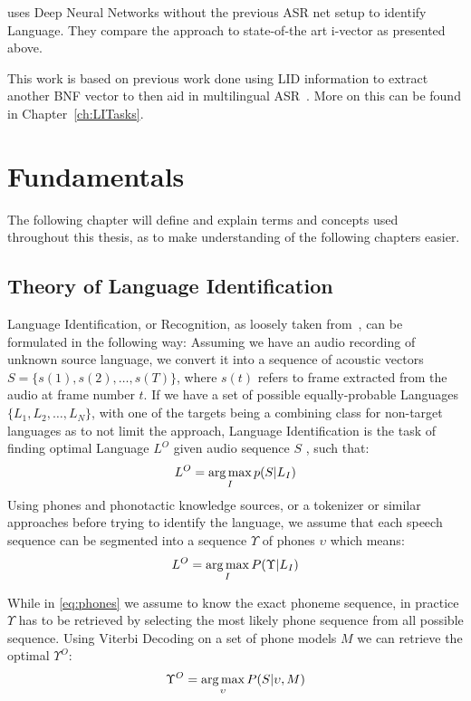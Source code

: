 \cite{6854622} uses Deep Neural Networks without the previous ASR net setup to identify Language. They compare the approach to state-of-the art i-vector as presented above.



This work is based on previous work done using LID information to extract another BNF vector to then aid in multilingual ASR~\cite{Mueller2016b}. More on this can be found in Chapter~\ref{ch:LITasks}.

\chapter{Fundamentals}
\label{ch:fund}

The following chapter will define and explain terms and concepts used throughout this thesis, as to make understanding of the following chapters easier.

\section{Theory of Language Identification}

Language Identification, or Recognition, as loosely taken from~\cite{6451097}, can be formulated in the following way: Assuming we have an audio recording of unknown source language, we convert it into a sequence of acoustic vectors \(S = \{ s(1), s(2), \dots , s(T)\}\), where \(s(t)\) refers to frame extracted from the audio at frame number \(t\). If we have a set of possible equally-probable Languages \(\{L_1,L_2,\dots,L_N\}\), with one of the targets being a combining class for non-target languages as to not limit the approach, Language Identification is the task of finding optimal Language \(L^O\) given audio sequence \(S\) , such that:
\begin{equation}
L^O = \operatorname*{arg\,max}_I p(S|L_I)
\end{equation}
Using phones and phonotactic knowledge sources, or a tokenizer or similar approaches before trying to identify the language, we assume that each speech sequence can be segmented into a sequence \(\Upsilon\) of phones \(\upsilon\) which means:
\begin{equation}
\label{eq:phones}
L^O = \operatorname*{arg\,max}_I P(\Upsilon|L_I)
\end{equation}

While in \ref{eq:phones} we assume to know the exact phoneme sequence, in practice \(\Upsilon\) has to be retrieved by selecting the most likely phone sequence from all possible sequence. Using Viterbi Decoding on a set of phone models \(M\) we can retrieve the optimal \(\Upsilon^O\):
\begin{equation}
\label{eq:phonesO}
\Upsilon^O = \operatorname*{arg\,max}_{\upsilon} P(S|\upsilon, M)
\end{equation} 

